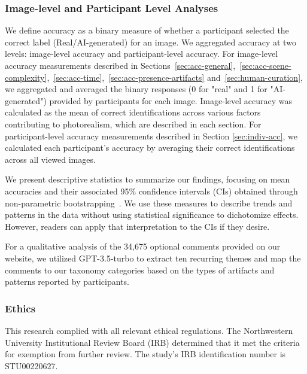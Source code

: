 \subsubsection{Image-level and Participant Level Analyses}\label{data-analysis}
We define accuracy as a binary measure of whether a participant selected the correct label (Real/AI-generated) for an image. We aggregated accuracy at two levels: image-level accuracy and participant-level accuracy. For image-level accuracy measurements described in Sections~\ref{sec:acc-general},~\ref{sec:acc-scene-complexity},~\ref{sec:acc-time},~\ref{sec:acc-presence-artifacts} and~\ref{sec:human-curation}, we aggregated and averaged the binary responses (0 for "real" and 1 for "AI-generated") provided by participants for each image. Image-level accuracy was calculated as the mean of correct identifications across various factors contributing to photorealism, which are described in each section. For participant-level accuracy measurements described in Section \ref{sec:indiv-acc}, we calculated each participant's accuracy by averaging their correct identifications across all viewed images. 

We present descriptive statistics to summarize our findings, focusing on mean accuracies and their associated 95\% confidence intervals (CIs) obtained through non-parametric bootstrapping~\cite{TransparentStatsJun2019}. We use these measures to describe trends and patterns in the data without using statistical significance to dichotomize effects.
However, readers can apply that interpretation to the CIs if they desire.

For a qualitative analysis of the 34,675 optional comments provided on our website, we utilized GPT-3.5-turbo to extract ten recurring themes and map the comments to our taxonomy categories based on the types of artifacts and patterns reported by participants. 

\subsubsection{Ethics} \leavevmode
This research complied with all relevant ethical regulations. The Northwestern University Institutional Review Board (IRB) determined that it met the criteria for exemption from further review. The study's IRB identification number is STU00220627.

